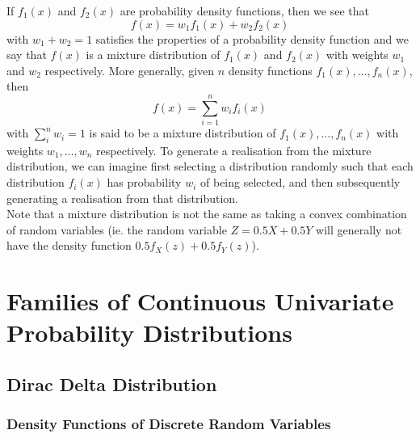 \documentclass[11pt]{report} %
\begin{document}
If $f_{1}\left(x\right)$ and $f_{2}\left(x\right)$ are probability density functions, then we see that
\begin{equation}
f\left(x\right) = w_{1}f_{1}\left(x\right) + w_{2}f_{2}\left(x\right)
\end{equation}
with $w_{1} + w_{2} = 1$ satisfies the properties of a probability density function and we say that $f\left(x\right)$ is a mixture distribution of $f_{1}\left(x\right)$ and $f_{2}\left(x\right)$ with weights $w_{1}$ and $w_{2}$ respectively. More generally, given $n$ density functions $f_{1}\left(x\right), \dots, f_{n}\left(x\right)$, then
\begin{equation}
f\left(x\right) = \sum_{i = 1}^{n}w_{i}f_{i}\left(x\right)
\end{equation}
with $\sum_{i}^{n}w_{i} = 1$ is said to be a mixture distribution of $f_{1}\left(x\right), \dots, f_{n}\left(x\right)$ with weights $w_{1}, \dots, w_{n}$ respectively. To generate a realisation from the mixture distribution, we can imagine first selecting a distribution randomly such that each distribution $f_{i}\left(x\right)$ has probability $w_{i}$ of being selected, and then subsequently generating a realisation from that distribution. \\

Note that a mixture distribution is not the same as taking a convex combination of random variables (ie. the random variable $Z = 0.5X + 0.5Y$ will generally not have the density function $0.5f_{X}\left(z\right) + 0.5f_{Y}\left(z\right)$). 

\section{Families of Continuous Univariate Probability Distributions}

\subsection{Dirac Delta Distribution}


\subsubsection{Density Functions of Discrete Random Variables}
\end{document}
